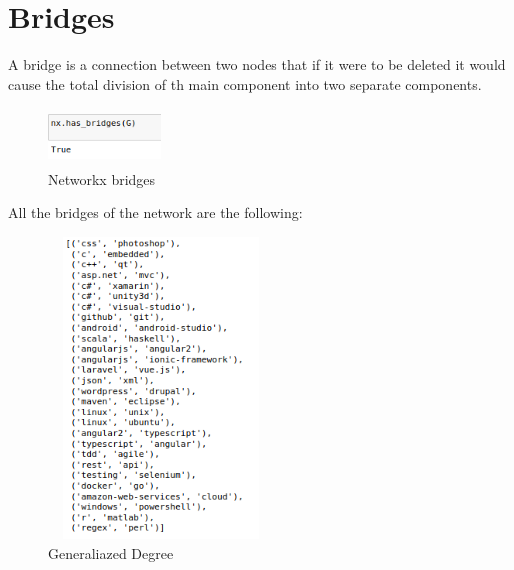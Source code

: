 \documentclass[12pt]{article}
\begin{document}
		\section{Bridges}
			A bridge is a connection between two nodes that if it were to be deleted it would cause the total division of th main component into two separate components.
			\begin{figure}[ht]
				\centering
				\includegraphics[width=3cm,height=1.5cm]{hasbridges}
				\caption{Networkx bridges}
			\end{figure}
			\FloatBarrier
			All the bridges of the network are the following:
			\begin{figure}[ht]
				\centering
				\includegraphics[width=6cm,height=8cm]{bridges}
				\caption{Generaliazed Degree}
			\end{figure}
			\FloatBarrier
\end{document}
